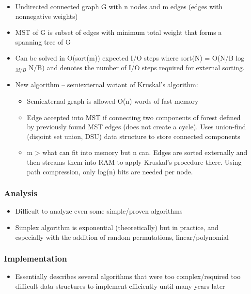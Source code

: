 \begin{itemize}
    \item Undirected connected graph G with n nodes and m edges (edges with nonnegative weights)
    \item MST of G is subset of edges with minimum total weight that forms a spanning tree of G
    \item Can be solved in O(sort(m)) expected I/O steps where sort(N) = O(N/B log$_{M/B}$ N/B) and denotes the number of I/O steps required for external sorting.
    \item New algorithm -- semiexternal variant of Kruskal's algorithm:
    \begin{itemize}
        \item Semiexternal graph is allowed O(n) words of fast memory
        \item Edge accepted into MST if connecting two components of forest defined by previously found MST edges (does not create a cycle). Uses union-find (disjoint set union, DSU) data structure to store connected components
        \item m > what can fit into memory but n can. Edges are sorted externally and then streams them into RAM to apply Kruskal's procedure there. Using path compression, only log(n) bits are needed per node.
    \end{itemize}
\end{itemize}

\subsubsection{Analysis}

\begin{itemize}
    \item Difficult to analyze even some simple/proven algorithms
    \item Simplex algorithm is exponential (theoretically) but in practice, and especially with the addition of random permutations, linear/polynomial
\end{itemize}

\subsubsection{Implementation}

\begin{itemize}
    \item Essentially describes several algorithms that were too complex/required too difficult data structures to implement efficiently until many years later
\end{itemize}

